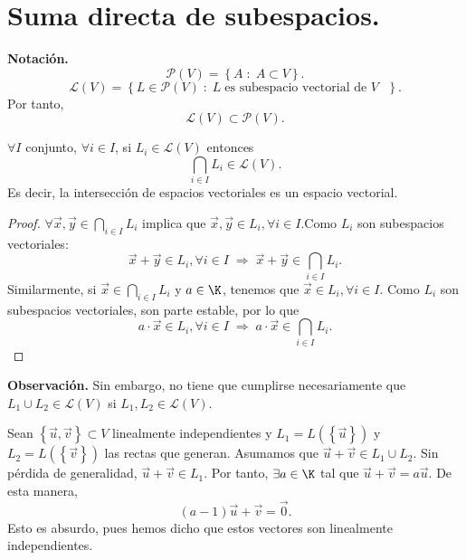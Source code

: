 \section{Suma directa de subespacios.}

\textbf{Notación. } 
\[\mathcal{P}\left(V\right) = \left\{ A \; : \; A \subset V\right\}  .\]
\[\mathcal{L}\left(V\right) = \left\{ L \in \mathcal{P}\left(V\right) \; : \; L \; \text{es subespacio vectorial de $\displaystyle V $ }\right\}  .\]
Por tanto, 
\[\mathcal{L}\left(V\right) \subset \mathcal{P}\left(V\right) .\]

\begin{ftheorem}[]
	\normalfont $\displaystyle \forall I $ conjunto, $\displaystyle \forall i \in I $, si $\displaystyle L_{i} \in \mathcal{L}\left(V\right) $ entonces
	\[\bigcap_{i \in I}L_{i} \in \mathcal{L}\left(V\right) .\]
Es decir, la intersección de espacios vectoriales es un espacio vectorial.
\end{ftheorem}

\begin{proof}
$\displaystyle \forall \vec{x}, \vec{y} \in \bigcap_{i \in I} L_{i} $ implica que $\displaystyle \vec{x}, \vec{y} \in L_{i}, \forall i \in I $.Como $\displaystyle L_{i} $ son subespacios vectoriales:
\[\vec{x}+\vec{y} \in L_{i}, \forall i \in I\; \Rightarrow \; \vec{x} + \vec{y} \in \bigcap_{i \in I}L_{i} .\]
Similarmente, si $\displaystyle \vec{x} \in \bigcap_{i \in I}L_{i} $ y $\displaystyle a \in \K $, tenemos que $\displaystyle \vec{x} \in L_{i}, \forall i \in I $. Como $\displaystyle L_{i} $ son subespacios vectoriales, son parte estable, por lo que 
\[a \cdot \vec{x} \in L_{i}, \forall i \in I \; \Rightarrow \; a \cdot \vec{x} \in \bigcap_{i \in I}L_{i} .\]
\end{proof}

\textbf{Observación. }Sin embargo, no tiene que cumplirse necesariamente que $\displaystyle L_{1} \cup L_{2} \in \mathcal{L}\left(V\right) $ si $\displaystyle L_{1}, L_{2} \in \mathcal{L}\left(V\right) $.

\begin{eg}
	\normalfont Sean $\displaystyle \left\{ \vec{u}, \vec{v}\right\} \subset V $ linealmente independientes y $\displaystyle L_{1} = L\left( \left\{ \vec{u}\right\} \right) $ y $\displaystyle L_{2} = L\left( \left\{ \vec{v}\right\} \right) $ las rectas que generan. Asumamos que $\displaystyle \vec{u} + \vec{v} \in L_{1} \cup L_{2} $. Sin pérdida de generalidad, $\displaystyle \vec{u} + \vec{v} \in L_{1} $. Por tanto, $\displaystyle \exists a \in \K $ tal que $\displaystyle \vec{u} + \vec{v} = a \vec{u} $. De esta manera, 
	\[\left(a-1\right) \vec{u} + \vec{v} = \vec{0} .\]
Esto es absurdo, pues hemos dicho que estos vectores son linealmente independientes.
\end{eg}

